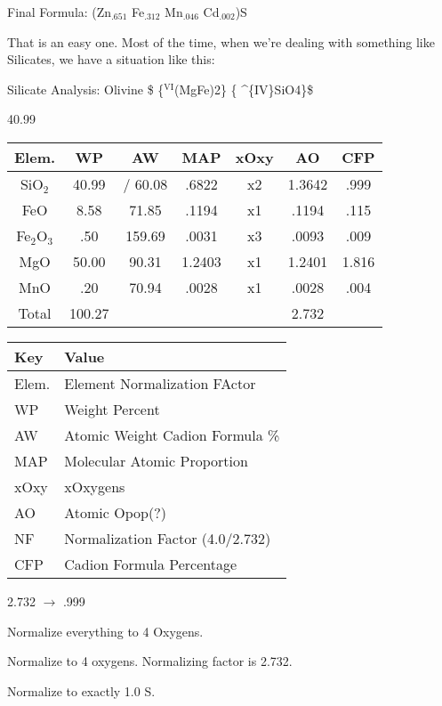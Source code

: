\documentclass[11pt]{article}
\begin{document}
Final Formula: (Zn$_{\text{.651}}$ Fe$_{\text{.312}}$ Mn$_{\text{.046}}$ Cd$_{\text{.002}}$)S

That is an easy one. Most of the time, when we're dealing with something like Silicates, we have a situation like this:

Silicate Analysis: Olivine \$ \ce\{$^{\text{VI}}$(MgFe)2\} \ce\{ \^{}\{IV\}SiO4\}\$

 40.99

\begin{center}
\begin{tabular}{|c|c|c|c|c|c|c|}
\hline
Elem. & WP & AW & MAP & xOxy & AO & CFP\\
\hline
SiO$_{\text{2}}$ & 40.99 & / 60.08 & .6822 & x2 & 1.3642 & .999\\
FeO & 8.58 & 71.85 & .1194 & x1 & .1194 & .115\\
Fe$_{\text{2}}$O$_{\text{3}}$ & .50 & 159.69 & .0031 & x3 & .0093 & .009\\
MgO & 50.00 & 90.31 & 1.2403 & x1 & 1.2401 & 1.816\\
MnO & .20 & 70.94 & .0028 & x1 & .0028 & .004\\
\hline
Total & 100.27 &  &  &  & 2.732 & \\
\hline
\end{tabular}
\end{center}

\begin{center}
\begin{tabular}{ll}
\hline
Key & Value\\
\hline
Elem. & Element Normalization FActor\\
WP & Weight Percent\\
AW & Atomic Weight Cadion Formula \%\\
MAP & Molecular Atomic Proportion\\
xOxy & xOxygens\\
AO & Atomic Opop(?)\\
NF & Normalization Factor (4.0/2.732)\\
CFP & Cadion Formula Percentage\\
\hline
\end{tabular}
\end{center}

2.732 $\rightarrow$ .999

Normalize everything to 4 Oxygens.

Normalize to 4 oxygens. Normalizing factor is 2.732.

Normalize to exactly 1.0 S.
\end{document}
